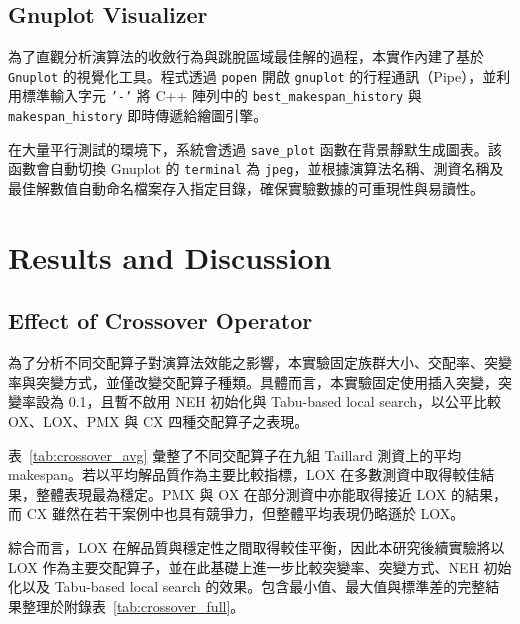 \documentclass[conference]{IEEEtran}
\begin{document}
\subsection{Gnuplot Visualizer}
為了直觀分析演算法的收斂行為與跳脫區域最佳解的過程，本實作內建了基於 \texttt{Gnuplot} 的視覺化工具。程式透過 \texttt{popen} 開啟 \texttt{gnuplot} 的行程通訊（Pipe），並利用標準輸入字元 \texttt{'-'} 將 C++ 陣列中的 \texttt{best\_makespan\_history} 與 \texttt{makespan\_history} 即時傳遞給繪圖引擎。

在大量平行測試的環境下，系統會透過 \texttt{save\_plot} 函數在背景靜默生成圖表。該函數會自動切換 Gnuplot 的 \texttt{terminal} 為 \texttt{jpeg}，並根據演算法名稱、測資名稱及最佳解數值自動命名檔案存入指定目錄，確保實驗數據的可重現性與易讀性。

\section{Results and Discussion}
\subsection{Effect of Crossover Operator}
為了分析不同交配算子對演算法效能之影響，本實驗固定族群大小、交配率、突變率與突變方式，並僅改變交配算子種類。具體而言，本實驗固定使用插入突變，突變率設為 0.1，且暫不啟用 NEH 初始化與 Tabu-based local search，以公平比較 OX、LOX、PMX 與 CX 四種交配算子之表現。

表~\ref{tab:crossover_avg} 彙整了不同交配算子在九組 Taillard 測資上的平均 makespan。若以平均解品質作為主要比較指標，LOX 在多數測資中取得較佳結果，整體表現最為穩定。PMX 與 OX 在部分測資中亦能取得接近 LOX 的結果，而 CX 雖然在若干案例中也具有競爭力，但整體平均表現仍略遜於 LOX。

綜合而言，LOX 在解品質與穩定性之間取得較佳平衡，因此本研究後續實驗將以 LOX 作為主要交配算子，並在此基礎上進一步比較突變率、突變方式、NEH 初始化以及 Tabu-based local search 的效果。包含最小值、最大值與標準差的完整結果整理於附錄表~\ref{tab:crossover_full}。
\end{document}
